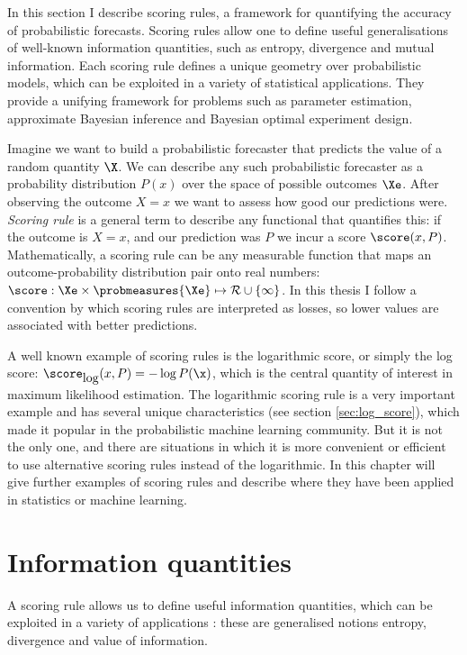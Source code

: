 

In this section I describe scoring rules, a framework for quantifying the accuracy of probabilistic forecasts. Scoring rules allow one to define useful generalisations of well-known information quantities, such as entropy, divergence and mutual information. Each scoring rule defines a unique geometry over probabilistic models, which can be exploited in a variety of statistical applications. They provide a unifying framework for problems such as parameter estimation, approximate Bayesian inference and Bayesian optimal experiment design.

Imagine we want to build a probabilistic forecaster that predicts the value of a random quantity $\X$. We can describe any such probabilistic forecaster as a probability distribution $P(x)$ over the space of possible outcomes $\Xe$. After observing the outcome $X=x$ we want to assess how good our predictions were. \emph{Scoring rule} is a general term to describe any functional that quantifies this: if the outcome is $X=x$, and our prediction was $P$ we incur a score $\score (x,P)$.  Mathematically, a scoring rule can be any measurable function that maps an outcome-probability distribution pair onto real numbers: $\score:\Xe\times\probmeasures{\Xe}\mapsto\mathcal{R}\cup\{\infty\}$. In this thesis I follow a convention by which scoring rules are interpreted as losses, so lower values are associated with better predictions.

A well known example of scoring rules is the logarithmic score, or simply the log score: $\score_{\mbox{log}}(x,P) = -\log P(\x)$, which is the central quantity of interest in maximum likelihood estimation. The logarithmic scoring rule is a very important example and has several unique characteristics (see section \ref{sec:log_score}), which made it popular in the probabilistic machine learning community. But it is not the only one, and there are situations in which it is more convenient or efficient to use alternative scoring rules instead of the logarithmic. In this chapter will give further examples of scoring rules and describe where they have been applied in statistics or machine learning.

\section{Information quantities}

A scoring rule allows us to define useful information quantities, which can be exploited in a variety of applications \cite[see also][]{Blaetal2332}: these are generalised notions entropy, divergence and value of information.

